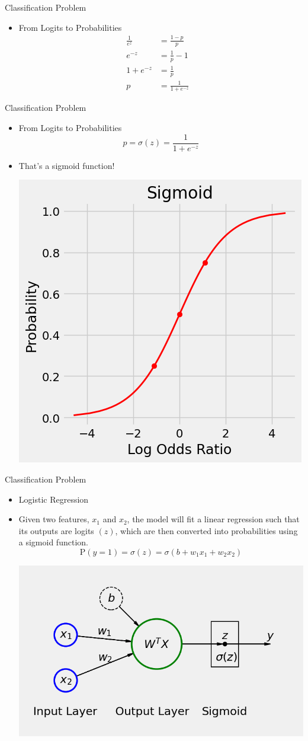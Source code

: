 \documentclass[pdflatex,compress,mathserif]{beamer}
\begin{document}
\begin{frame}{Classification Problem}
	\begin{itemize}
		\item From Logits to Probabilities
		$$
		\begin{aligned}
			\frac{1}{e^z}& = \frac{1-p}{p}
			\\
			e^{-z}& = \frac{1}{p} - 1
			\\
			1 + e^{-z}& = \frac{1}{p}&
			\\
			p& = \frac{1}{1 + e^{-z}}
		\end{aligned}
		$$
	\end{itemize}
\end{frame}

\begin{frame}{Classification Problem}
	\begin{itemize}
		\item From Logits to Probabilities
		$$
		p = \sigma(z) = \frac{1}{1+e^{-z}}
		$$
		\item That’s a sigmoid function!
		\begin{center}
			\includegraphics[width=0.5\linewidth]{img/20}
		\end{center}
	\end{itemize}
	\vfill\null
\end{frame}

\begin{frame}{Classification Problem}
	\begin{itemize}
		\item Logistic Regression
		\item Given two features, $x_1$ and $x_2$, the model will fit a linear regression such that its outputs are logits $(z)$, which are then converted into probabilities using a sigmoid function.
		$$
		\text{P}(y=1) = \sigma(z) = \sigma(b+w_1x_1+w_2x_2)
		$$
		\begin{center}
			\includegraphics[width=0.6\linewidth]{img/21}
		\end{center}
	\end{itemize}
	\vfill\null
\end{frame}
\end{document}
